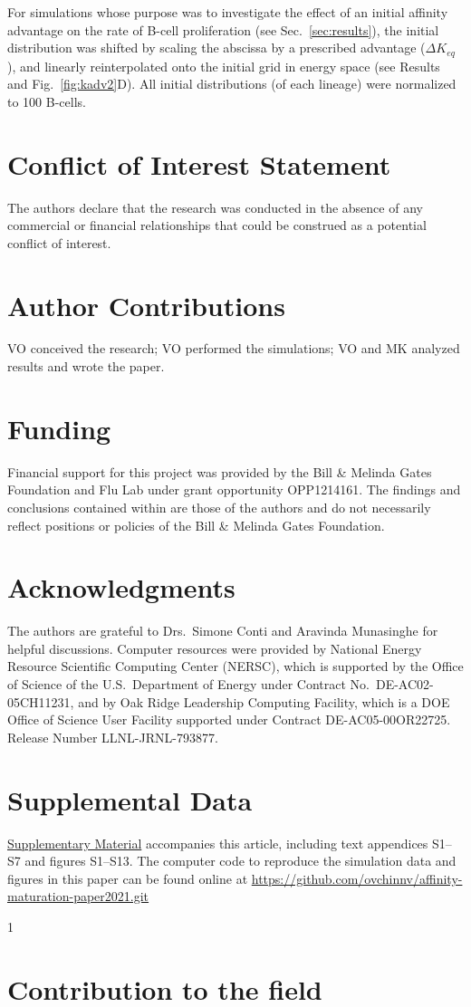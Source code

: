 \documentclass[utf8]{frontiersHLTH}%
\def\significance{1}
\newcommand{\mk}[1]{} %
\newcommand{\fig}[1]{Fig.~\ref{fig:#1}}
\newcommand{\Sec}[1]{Sec.~\ref{sec:#1}}
\renewcommand{\sec}[1]{\Sec{#1}}
\begin{document}
For simulations whose purpose was to investigate the
effect of an initial affinity advantage on the rate of B-cell
proliferation (see \sec{results}), the initial distribution was shifted by scaling the
abscissa by a prescribed advantage ($\Delta K_{eq}$), {\mk{[kappa should be
superscript]}} and linearly
reinterpolated onto the initial grid in energy space (see Results and \fig{kadv2}D). All
initial distributions (of each lineage) were normalized to 100 B-cells.


\section*{Conflict of Interest Statement}
The authors declare that the research was conducted in the absence of any
commercial or financial relationships that could be construed as a
potential conflict of interest.
%
\section*{Author Contributions}
VO conceived the research;
VO performed the simulations;
VO and MK analyzed results and wrote the paper.
%
\section*{Funding}
Financial support for this project was provided by the Bill \& Melinda
Gates Foundation and Flu Lab under grant opportunity OPP1214161. The
findings and conclusions contained within are those of the authors and do
not necessarily reflect positions or policies of the Bill \& Melinda Gates
Foundation.
\section*{Acknowledgments}
The authors are grateful to Drs.~Simone Conti and Aravinda Munasinghe
for helpful discussions.
Computer resources were provided by National Energy Resource Scientific
Computing Center (NERSC), which is supported by the Office of Science of
the U.S.~Department of Energy under Contract No.~DE-AC02-05CH11231, and
by Oak Ridge Leadership Computing Facility, which is a DOE Office of
Science User Facility supported under Contract DE-AC05-00OR22725. Release
Number LLNL-JRNL-793877.

\section*{Supplemental Data}
\href{http://home.frontiersin.org/about/author-guidelines#SupplementaryMaterial}{Supplementary Material}
accompanies this article, including text appendices S1--S7 and figures S1--S13.
The computer code to reproduce the simulation data and figures in this paper can be found online at \url{https://github.com/ovchinnv/affinity-maturation-paper2021.git}




\clearpage
\ifx\significance\undefined
\else
\if\significance1
\section*{Contribution to the field}
\noindent

\fi
\fi
%
\end{document}
